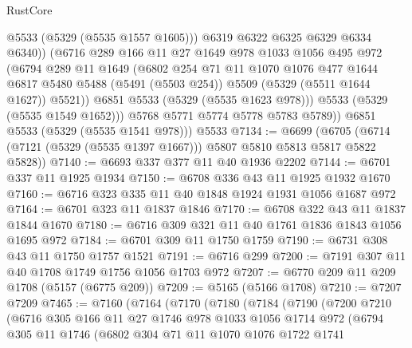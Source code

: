 \begin{lexlean}{RustCore}
\begin{coremodule}
                  @5533
                  (@5329 (@5535 @1557 @1605)))
                @6319
                @6322
                @6325
                @6329
                @6334
                @6340))
            (@6716
              @289
              @166
              @11
              @27
              @1649
              @978
              @1033
              @1056
              @495
              @972
              (@6794
                @289
                @11
                @1649
                (@6802
                  @254
                  @71
                  @11
                  @1070
                  @1076
                  @477
                  @1644
                  @6817
                  @5480
                  @5488
                  (@5491 (@5503 @254))
                  @5509
                  (@5329 (@5511 @1644 @1627))
                  @5521))
              @6851
              @5533
              (@5329 (@5535 @1623 @978)))
            @5533
            (@5329 (@5535 @1549 @1652)))
          @5768
          @5771
          @5774
          @5778
          @5783
          @5789))
      @6851
      @5533
      (@5329 (@5535 @1541 @978)))
    @5533
@7134 := @6699
    (@6705 (@6714 (@7121 (@5329 (@5535 @1397 @1667))) @5807 @5810 @5813 @5817 @5822 @5828))
@7140 := @6693 @337 @377 @11 @40 @1936 @2202
@7144 := @6701 @337 @11 @1925 @1934
@7150 := @6708 @336 @43 @11 @1925 @1932 @1670
@7160 := @6716 @323 @335 @11 @40 @1848 @1924 @1931 @1056 @1687 @972
@7164 := @6701 @323 @11 @1837 @1846
@7170 := @6708 @322 @43 @11 @1837 @1844 @1670
@7180 := @6716 @309 @321 @11 @40 @1761 @1836 @1843 @1056 @1695 @972
@7184 := @6701 @309 @11 @1750 @1759
@7190 := @6731 @308 @43 @11 @1750 @1757 @1521
@7191 := @6716 @299
@7200 := @7191 @307 @11 @40 @1708 @1749 @1756 @1056 @1703 @972
@7207 := @6770 @209 @11 @209 @1708 (@5157 (@6775 @209))
@7209 := @5165 (@5166 @1708)
@7210 := @7207 @7209
@7465 := @7160
    (@7164
      (@7170
        (@7180
          (@7184
            (@7190
              (@7200
                @7210
                (@6716
                  @305
                  @166
                  @11
                  @27
                  @1746
                  @978
                  @1033
                  @1056
                  @1714
                  @972
                  (@6794
                    @305
                    @11
                    @1746
                    (@6802
                      @304
                      @71
                      @11
                      @1070
                      @1076
                      @1722
                      @1741

\end{coremodule}
\end{lexlean}
